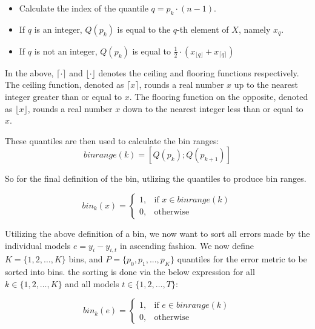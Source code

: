 \begin{itemize}
    \item Calculate the index of the quantile $q = p_{k} \cdot (n-1)$.
    \item If $q$ is an integer, $Q(p_{k})$ is equal to the $q$-th element of $X$, namely $x_{q}$.
    \item If $q$ is not an integer, $Q(p_{k})$ is equal to $\frac{1}{2} \cdot (x_{\lfloor q \rfloor} + x_{\lceil q \rceil})$
\end{itemize}

In the above, $\lceil \cdot \rceil$ and $\lfloor \cdot \rfloor$ denotes the ceiling and flooring functions respectively.
The ceiling function, denoted as $\lceil x \rceil$, rounds a real number $x$ up to the nearest integer greater than or equal to $x$. The flooring
function on the opposite, denoted as $\lfloor x \rfloor$, rounds a real number $x$ down to the nearest integer less than or equal to $x$.

These quantiles are then used to calculate the bin ranges:
\begin{equation}\label{eq:binrange}
    binrange(k) = \left[ Q(p_{k}); Q(p_{k+1}) \right]
\end{equation}

So for the final definition of the bin, utlizing the quantiles to produce bin ranges.

\begin{equation}\label{eq:bin-k}
    bin_{k}(x) = \begin{cases}
        1, & \text{if } x \in binrange(k) \\
        0, & \text{otherwise}
    \end{cases}
\end{equation}

Utilizing the above definition of a bin, we now want to sort all errors made by the individual models $e = y_{i} - {y}_{i,t}$ in ascending fashion.
We now define $K = \{1,2,\ldots,K\}$ bins, and $P = \{p_0, p_1, ..., p_K\}$ quantiles for the error metric to be sorted into bins.
the sorting is done via the below expression for all $k \in \{1,2,\ldots,K\}$ and all models $t \in \{1,2,\ldots,T\}$:

\begin{equation}\label{eq:bin-error}
    bin_{k}(e) =\begin{cases}
        1, & \text{if } e \in binrange(k) \\
        0, & \text{otherwise}
    \end{cases}
\end{equation}

